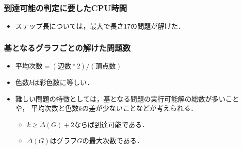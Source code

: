 \begin{frame}
  \frametitle{到達可能の判定に要したCPU時間}

  \begin{exampleblock}{}
    \centering
    \scalebox{0.75}{}
  \end{exampleblock}
  \begin{itemize}
    \item ステップ長については，最大で長さ17の問題が解けた．
  \end{itemize}
\end{frame}
\begin{frame}
  \frametitle{基となるグラフごとの解けた問題数}
  
  \begin{exampleblock}{}
    \centering
    \scalebox{0.8}{}
  \end{exampleblock}
  \begin{itemize}
    \item $\textrm{平均次数} = (\textrm{辺数}*2) / (\textrm{頂点数})$
    \item 色数$k$は彩色数に等しい．
    \item 難しい問題の特徴としては，基となる問題の実行可能解の総数が多いことや，
      平均次数と色数$k$の差が少ないことなどが考えられる．
      \begin{itemize}
        \item $k \ge \Delta(G) + 2$ならば到達可能である．
        \item $\Delta(G)$はグラフ$G$の最大次数である．
      \end{itemize}
  \end{itemize}
\end{frame}
